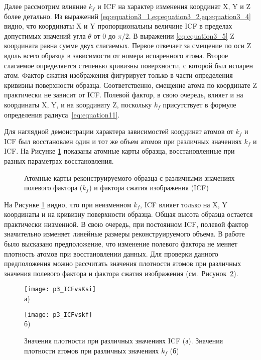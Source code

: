 Далее рассмотрим влияние $k_f$ и ICF на характер изменения координат X, Y и Z более детально. Из выражений \cref{eq:equation3_1,eq:equation3_2,eq:equation3_4} видно, что координаты X и Y  пропорциональны величине ICF в пределах допустимых значений угла $\theta$ от 0 до $\pi/2$. В выражении \cref{eq:equation3_5} Z координата равна сумме двух слагаемых. Первое отвечает за смещение по оси Z вдоль всего образца в зависимости от номера испаренного атома. Второе слагаемое определяется степенью кривизны поверхности, с которой был испарен атом. Фактор сжатия изображения фигурирует только в части определения кривизны поверхности образца. Соответственно, смещение атома по координате Z практически не зависит от ICF. Полевой фактор, в свою очередь, влияет и на координаты X, Y, и на координату Z, поскольку $k_f$ присутствует в формуле определения радиуса~\cref{eq:equation11}.

Для наглядной демонстрации характера зависимостей координат атомов от $k_f$ и ICF был восстановлен один и тот же объем атомов при различных значениях $k_f$ и ICF. На Рисунке \cref{fig:p3_3Dparts} показаны атомные карты образца, восстановленные при разных параметрах восстановления.

\begin{figure}[htb]
	\caption{Атомные карты реконструируемого образца с различными значениях полевого фактора ($k_f$) и фактора сжатия изображения (ICF) \cite{scbibDensity}}
	\label{fig:p3_3Dparts}
\end{figure}

На Рисунке \cref{fig:p3_3Dparts} видно, что при неизменном $k_f$, ICF  влияет только на X, Y координаты и на кривизну поверхности образца. Общая высота образца остается практически низменной. В свою очередь, при постоянном ICF, полевой фактор значительно изменяет линейные размеры реконструируемого объема. В работе \cite{scbibDensity} было высказано предположение, что изменение полевого фактора не меняет плотность атомов при восстановлении данных. Для проверки данного предположения можно рассчитать значения плотности атомов при различных значения полевого фактора и фактора сжатия изображения (см.~Рисунок~\cref{fig:p3_ICF}).

\begin{figure}[htb]
	\begin{minipage}[b][][b]{0.49\textwidth}\centering
		\texttt{[image: p3\_ICFvsKsi]} \\ а)
	\end{minipage}
	\begin{minipage}[b][][b]{0.49\textwidth}\centering
		\texttt{[image: p3\_ICFvskf]} \\ б)
	\end{minipage}
	\caption{Значения плотности при различных значениях ICF (а). Значения плотности атомов при различных значениях $k_f$ (б) \cite{scbibDensity}}
	\label{fig:p3_ICF}
\end{figure}

